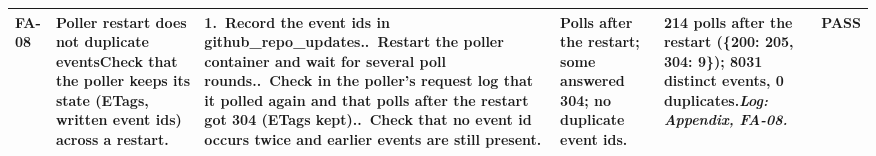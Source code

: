 {\begin{longtable}{@{}L{1.1cm}L{5.8cm}L{5.4cm}L{3.9cm}L{5.5cm}L{1.3cm}@{}}
\midrule[0.3pt]
\textbf{FA-08} & \textbf{Poller restart does not duplicate events}\newline Check that the poller keeps its state (ETags, written event ids) across a restart. & 1.~Record the event ids in github\_\allowbreak{}repo\_\allowbreak{}updates..~Restart the poller container and wait for several poll rounds..~Check in the poller's request log that it polled again and that polls after the restart got 304 (ETags kept)..~Check that no event id occurs twice and earlier events are still present. & Polls after the restart; some answered 304; no duplicate event ids. & 214 polls after the restart (\{200: 205, 304: 9\}); 8031 distinct events, 0 duplicates.\newline \textit{Log: Appendix, FA-08.} & \textbf{\textcolor{green!45!black}{PASS}} \\
\midrule[0.3pt]
\end{longtable}}
